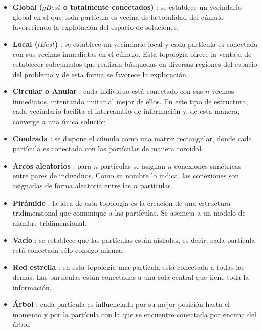   \begin{itemize}
   \item \textbf{Global ($gBest$ o totalmente conectados)} \cite{JKRBParticle}: se establece un vecindario global en el que toda part\'icula 
   es vecina de la totalidad del c\'umulo favoreciendo la explotaci\'on del espacio de soluciones.
   \item \textbf{Local ($lBest$)} \cite{JKRBParticle}: se establece un vecindario local y cada part\'icula es conectada con sus vecinas inmediatas 
   en el c\'umulo. Esta topolog\'ia ofrece la ventaja de establecer subc\'umulos que realizan b\'usquedas en diversas regiones del espacio 
   del problema y de esta forma se favorece la exploraci\'on.
   \item \textbf{Circular o Anular}\DIFdelbegin %
\DIFdelend : cada individuo est\'a conectado con sus $n$ vecinos inmediatos, intentando imitar al mejor de ellos. En este 
   tipo de estructura, cada vecindario facilita el intercambio de informaci\'on y, de esta manera, converge a una \'unica soluci\'on.
   \item \textbf{Cuadrada} \cite{JKRBPaM}: se dispone el c\'umulo como una matriz rectangular, donde cada part\'icula es conectada 
   con las part\'iculas de manera toroidal.
   \item \textbf{Arcos aleatorios}\DIFdelbegin %
\DIFdelend : para $n$ part\'iculas se asignan $n$ conexiones sim\'etricas entre pares de individuos. Como su nombre 
   lo indica, las conexiones son asignadas de forma aleatoria entre las $n$ part\'iculas.
   \item \textbf{Pir\'amide}\DIFdelbegin %
\DIFdelend : la idea de esta topolog\'ia es la creaci\'on de una estructura tridimensional que comunique a las part\'iculas. 
   Se asemeja a un modelo de alambre tridimensional.
   \item \textbf{Vac\'io} \cite{Margarita01}: se establece que las part\'iculas est\'an aisladas, es decir, cada part\'icula est\'a conectada 
    s\'olo consigo misma.
   \item \textbf{Red estrella} \cite{Margarita01}: en esta topolog\'ia una part\'icula est\'a conectada a todas las dem\'as. Las part\'iculas est\'an conectadas 
   a una sola central que tiene toda la informaci\'on. 
   \item \textbf{\'Arbol}\DIFdelbegin %
\DIFdelend : cada part\'icula es influenciada por su mejor posici\'on hasta el momento y por la part\'icula con la que 
   se encuentre conectada por encima del \'arbol.
  \end{itemize}

